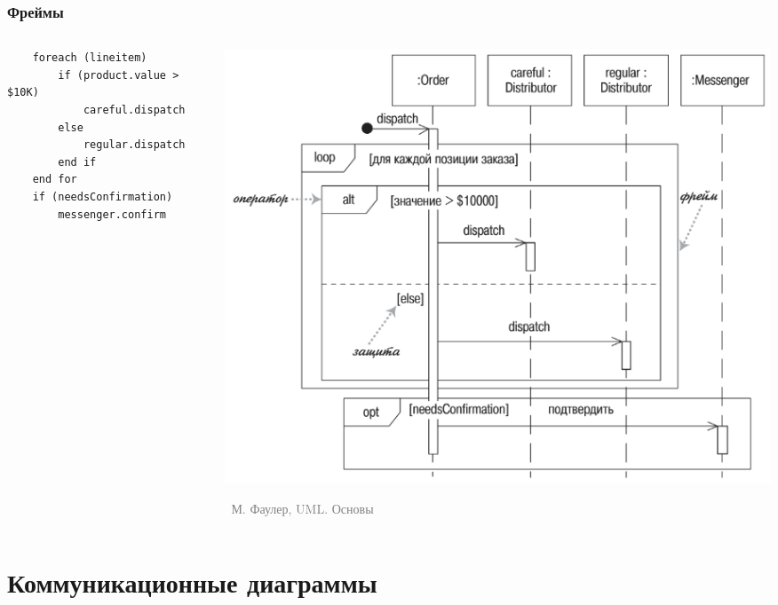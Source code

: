 \documentclass[xetex,mathserif,serif]{beamer}
\newcommand{\attribution}[1] {
	\vspace{-5mm}\begin{flushright}\begin{scriptsize}\textcolor{gray}{\textcopyright\, #1}\end{scriptsize}\end{flushright}
}
\begin{document}
	\begin{frame}[fragile]
		\frametitle{Фреймы}
		\begin{columns}
			\begin{column}{0.5\textwidth}
				\begin{small}
					\begin{verbatim}
    foreach (lineitem)
        if (product.value > $10K)
            careful.dispatch
        else
            regular.dispatch
        end if
    end for
    if (needsConfirmation) 
        messenger.confirm
					\end{verbatim}
				\end{small}
			\end{column}
			\begin{column}{0.5\textwidth}
				\begin{center}
					\includegraphics[width=\textwidth]{sequenceDiagramFrames.png}
					\attribution{М. Фаулер, UML. Основы}
				\end{center}
			\end{column}
		\end{columns}
	\end{frame}

	\section{Коммуникационные диаграммы}
\end{document}
